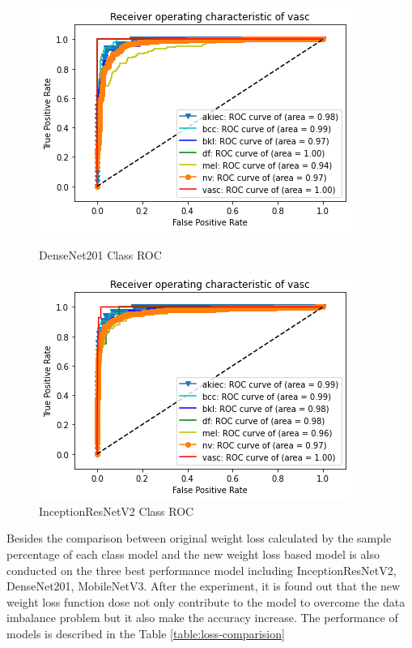 \documentclass[sensors,article,submit,pdftex,moreauthors]{Definitions/mdpi}
\begin{document}
\begin{figure}[!htb]
	\begin{minipage}{0.48\textwidth}
		\centering
		\includegraphics[width=1\linewidth]{Definitions/ROC/densenet201}
		\caption{DenseNet201 Class ROC}\label{fig:densenet201auc}
	\end{minipage}\hfill
	\begin{minipage}{0.48\textwidth}
		\centering
		\includegraphics[width=1\linewidth]{Definitions/ROC/irv2}
		\caption{InceptionResNetV2 Class ROC}\label{fig:irv2auc}
	\end{minipage}
\end{figure}

Besides the comparison between original weight loss calculated by the sample percentage of each class model and the new weight loss based model is also conducted on the three best performance model including InceptionResNetV2, DenseNet201, MobileNetV3. After the experiment, it is found out that the new weight loss function dose not only contribute to the model to overcome the data imbalance problem but it also make the accuracy increase. The performance of models is described in the Table \ref{table:loss-comparision}
\end{document}
